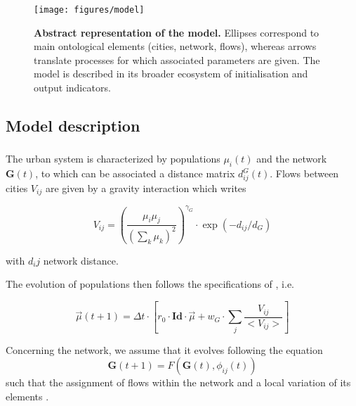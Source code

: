\begin{figure}
\texttt{[image: figures/model]}
\caption{\textbf{Abstract representation of the model.} Ellipses correspond to main ontological elements (cities, network, flows), whereas arrows translate processes for which associated parameters are given. The model is described in its broader ecosystem of initialisation and output indicators.\label{fig:macrocoevol:model}}
\end{figure}


\subsection{Model description}


\subsubsection{}

The urban system is characterized by populations $\mu_i(t)$ and the network $\mathbf{G}(t)$, to which can be associated a distance matrix $d^G_{ij}(t)$. Flows between cities $V_{ij}$ are given by a gravity interaction which writes

\begin{equation}
V_{ij} = \left(\frac{\mu_i\mu_j}{\left(\sum_k{\mu_k}\right)^2}\right)^{\gamma_G}\cdot \exp{\left(-d_{ij}/d_G\right)}
\end{equation}

with $d_ij$ network distance.

The evolution of populations then follows the specifications of \cite{raimbault2018indirect}, i.e.

\begin{equation}
\vec{\mu}(t+1)=\Delta t\cdot \left[ r_0\cdot \mathbf{Id}\cdot \vec{\mu} + w_G\cdot \sum_j \frac{V_{ij}}{<V_{ij}>}\right]
\end{equation}

Concerning the network, we assume that it evolves following the equation
\begin{equation}
\mathbf{G}(t + 1) = F(\mathbf{G}(t),\phi_{ij}(t))
\end{equation}
such that the assignment of flows within the network and a local variation of its elements  .


